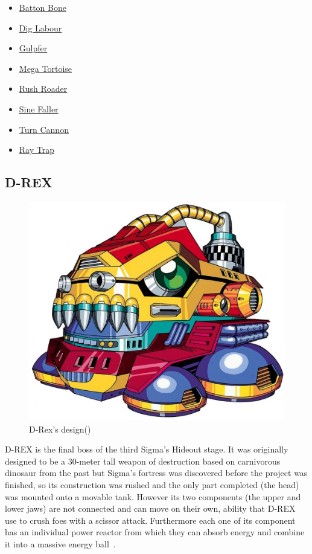 \begin{itemize}
	\item \hyperlink{enem:Batton_Bone}{Batton Bone}
	\item \hyperlink{enem:Dig_Labour}{Dig Labour}
	\item \hyperlink{enem:Gulpfer}{Gulpfer}
	\item \hyperlink{enem:Mega_Tortoise}{Mega Tortoise}
	\item \hyperlink{enem:Rush_Roader}{Rush Roader}
	\item \hyperlink{enem:Sine_Faller}{Sine Faller}
	\item \hyperlink{enem:Turn_Cannon}{Turn Cannon}
	\item \hyperlink{enem:Ray_Trap}{Ray Trap}
\end{itemize} 

\subsection{D-REX}
\begin{figure}[htp]
	\centering
	\includegraphics[width=0.4\linewidth]{figures/X1/Sigma_stages/Drex.jpg}
	\caption{D-Rex's design(\cite{book:MMX_Complete_art})}
\end{figure}

D-REX is the final boss of the third Sigma's Hideout stage. It was originally designed to be a 30-meter tall weapon of destruction based on carnivorous dinosaur from the past but Sigma's fortress was discovered before the project was finished, so its construction was rushed and the only part completed (the head) was mounted onto a movable tank. However its two components (the upper and lower jaws) are not connected and can move on their own, ability that D-REX use to crush foes with a scissor attack. Furthermore each one of its component has an individual power reactor from which they can absorb energy and combine it into a massive energy ball~\cite{wayback:X_resources}.

